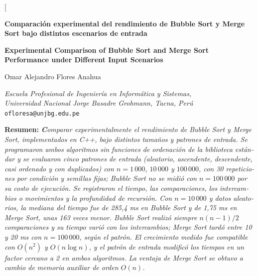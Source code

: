 \documentclass[12pt,a4paper,twocolumn]{article}
\begin{document}
 
\twocolumn[{%
\begin{center}
{\fontsize{16}{19}\selectfont
\textbf{Comparación experimental del rendimiento de
Bubble Sort y Merge Sort bajo distintos escenarios de entrada}
\par}
 
\vspace{0.3cm}
 
{\fontsize{14}{17}\selectfont
\textbf{Experimental Comparison of Bubble Sort and Merge Sort
Performance under Different Input Scenarios}
\par}
 
\vspace{0.5cm}
 
{\normalsize
Omar Alejandro Flores Anahua\par}
 
{\small
\textit{Escuela Profesional de Ingeniería en Informática y Sistemas,}\\
\textit{Universidad Nacional Jorge Basadre Grohmann, Tacna, Perú}\\
\texttt{ofloresa@unjbg.edu.pe}
\par}
\end{center}
 
\vspace{0.3cm}
 
\begin{otherlanguage}{spanish}
{\fontsize{11}{13}\selectfont
 
\noindent\textbf{Resumen:}
\textit{\textbf Comparar experimentalmente el rendimiento de
Bubble Sort y Merge Sort, implementados en C++, bajo distintos tamaños
y patrones de entrada. Se programaron ambos algoritmos
sin funciones de ordenación de la biblioteca estándar y se evaluaron cinco
patrones de entrada (aleatorio, ascendente, descendente, casi ordenado y con
duplicados) con $n = 1\,000$, $10\,000$ y $100\,000$, con 30 repeticiones por
condición y semillas fijas; Bubble Sort no se midió con $n = 100\,000$ por su
costo de ejecución. Se registraron el tiempo, las comparaciones, los
intercambios o movimientos y la profundidad de recursión. Con $n = 10\,000$ y datos aleatorios, la mediana del tiempo fue de 285,4 ms en Bubble Sort y de 1,75 ms en Merge Sort, unas 163 veces
menor. Bubble Sort realizó siempre $n(n-1)/2$ comparaciones y su tiempo varió
con los intercambios; Merge Sort tardó entre 10 y 20 ms con $n = 100\,000$,
según el patrón. El crecimiento medido fue compatible con $O(n^2)$ y $O(n\log n)$, y el patrón de entrada modificó los tiempos en un factor cercano a 2 en ambos algoritmos. La ventaja de Merge Sort se obtuvo a cambio de memoria auxiliar de orden $O(n)$.}
 
}
\end{otherlanguage}}
\end{document}

